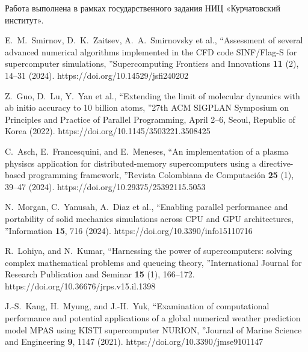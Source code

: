 \documentclass[
11pt,%
tightenlines,%
twoside,%
onecolumn,%
nofloats,%
nobibnotes,%
nofootinbib,%
superscriptaddress,%
noshowpacs,%
centertags]%
{revtex4}
\begin{document}
\begin{acknowledgments}
Работа выполнена в рамках государственного задания НИЦ «Курчатовский институт».
\end{acknowledgments}

%
%

\begin{thebibliography}{99}

E.~M.~Smirnov, D.~K.~Zaitsev, A.~A.~Smirnovsky et al., \textquotedblleft Assessment of several advanced numerical algorithms implemented in the CFD code SINF/Flag-S for supercomputer simulations, \textquotedblright Supercomputing Frontiers and Innovations \textbf{11} (2), 14--31 (2024). https://doi.org/10.14529/jsfi240202

Z.~Guo, D.~Lu, Y.~Yan et al., \textquotedblleft Extending the limit of molecular dynamics with ab initio accuracy to 10 billion atoms, \textquotedblright 27th ACM SIGPLAN Symposium on Principles and Practice of Parallel Programming, April 2--6, Seoul, Republic of Korea (2022). https://doi.org/10.1145/3503221.3508425

C.~Asch, E.~Francesquini, and E.~Meneses, \textquotedblleft An implementation of a plasma physiscs application for distributed-memory supercomputers using a directive-based programming framework, \textquotedblright Revista Colombiana de Computaci\'on \textbf{25} (1), 39--47 (2024). https://doi.org/10.29375/25392115.5053

N.~Morgan, C.~Yanusah, A.~Diaz et al., \textquotedblleft Enabling parallel performance and portability of solid mechanics simulations across CPU and GPU architectures, \textquotedblright Information \textbf{15}, 716 (2024). https://doi.org/10.3390/info15110716

R.~Lohiya, and N.~Kumar, \textquotedblleft Harnessing the power of supercomputers: solving complex mathematical problems and queueing theory, \textquotedblright International Journal for Research Publication and Seminar \textbf{15} (1), 166--172. https://doi.org/10.36676/jrps.v15.il.1398

J.-S.~Kang, H.~Myung, and J.-H.~Yuk, \textquotedblleft Examination of computational performance and potential applications of a global numerical weather prediction model MPAS using KISTI supercomputer NURION, \textquotedblright Journal of Marine Science and Engineering \textbf{9}, 1147 (2021). https://doi.org/10.3390/jmse9101147


\end{thebibliography}
\end{document}

